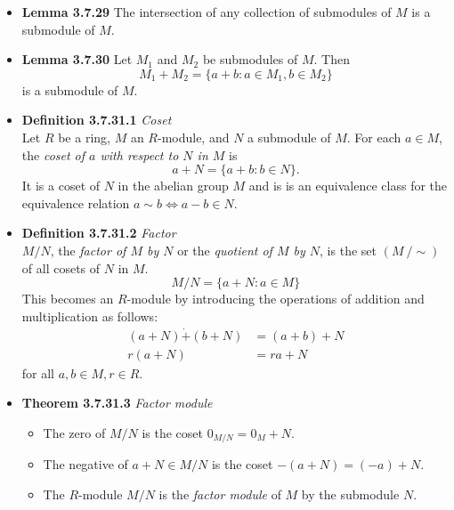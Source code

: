 \documentclass[11pt,a4paper]{article}
\begin{document}
\begin{itemize}
    \item \textbf{Lemma 3.7.29} The intersection of any collection of submodules of $M$ is a
        submodule of $M$.

    \item \textbf{Lemma 3.7.30} Let $M_1$ and $M_2$ be submodules of $M$.
        Then
        \[
            M_1 + M_2 = \{ a + b : a \in M_1, b \in M_2 \}
        \]
        is a submodule of $M$.

    \item \textbf{Definition 3.7.31.1} \emph{Coset} \\
        Let $R$ be a ring, $M$ an $R$-module, and $N$ a submodule of $M$.
        For each $a \in M$, the \emph{coset of $a$ with respect to $N$ in $M$} is
        \[
            a + N = \{ a + b : b \in N \}.
        \]
        It is a coset of $N$ in the abelian group $M$ and is is an equivalence class for the
        equivalence relation $a \sim b \iff a-b \in N$.

    \item \textbf{Definition 3.7.31.2} \emph{Factor} \\
        $M/N$, the \emph{factor of $M$ by $N$} or the \emph{quotient of $M$ by $N$},
        is the set $(M \ / \sim)$ of all cosets of $N$ in $M$.
        \[
            M/N = \{ a + N : a \in M \}
        \]
        This becomes an $R$-module by introducing the operations of addition and
        multiplication as follows:
        \begin{align*}{}
            (a + N) \dot{+} (b + N) & = (a + b) + N \\
            r(a + N)                & = ra + N
        \end{align*}
        for all $a, b \in M, r \in R$.

    \item \textbf{Theorem 3.7.31.3} \emph{Factor module}
        \begin{itemize}
            \item The zero of $M/N$ is the coset $0_{M/N} = 0_M + N$.
            \item The negative of $a + N \in M/N$ is the coset $-(a+N) = (-a)+N$.
            \item The $R$-module $M/N$ is the \emph{factor module} of $M$ by the submodule
                $N$.
        \end{itemize}


\end{itemize}
\end{document}
